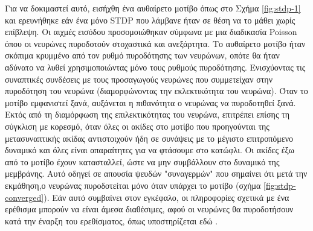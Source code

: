 \documentclass[12pt]{report}
\begin{document}
Για να δοκιμαστεί αυτό, εισήχθη ένα αυθαίρετο μοτίβο όπως στο Σχήμα \ref{fig:stdp-1} και ερευνήθηκε εάν ένα μόνο \textlatin{STDP} που λάμβανε ήταν σε θέση να το μάθει χωρίς επίβλεψη. Οι αιχμές εισόδου προσομοιώθηκαν σύμφωνα με μια διαδικασία \textlatin{Poisson} όπου οι νευρώνες πυροδοτούν στοχαστικά και ανεξάρτητα. Το αυθαίρετο μοτίβο ήταν σκόπιμα κρυμμένο από τον ρυθμό πυροδότησης των νευρώνων, οπότε θα ήταν αδύνατο να λυθεί χρησιμοποιώντας μόνο τους ρυθμούς πυροδότησης. Ενισχύοντας τις συναπτικές συνδέσεις με τους προσαγωγούς νευρώνες που συμμετείχαν στην πυροδότηση του νευρώνα (διαμορφώνοντας την εκλεκτικότητα του νευρώνα). Όταν το μοτίβο εμφανιστεί ξανά, αυξάνεται η πιθανότητα ο νευρώνας να πυροδοτηθεί ξανά. Εκτός από τη διαμόρφωση της επιλεκτικότητας του νευρώνα, επιτρέπει επίσης τη σύγκλιση με κορεσμό, όταν όλες οι ακίδες στο μοτίβο που προηγούνται της μετασυναπτικής ακίδας αντιστοιχούν ήδη σε συνάψεις με το μέγιστο επιτροπόμενο δυναμικό και όλες είναι απαραίτητες για να φτάσουμε στο κατώφλι. Οι ακίδες έξω από το μοτίβο έχουν κατασταλλεί, ώστε να μην συμβάλλουν στο δυναμικό της μεμβράνης. Αυτό οδηγεί σε απουσία ψευδών "συναγερμών" που σημαίνει ότι μετά την εκμάθηση,ο νευρώνας πυροδοτείται  μόνο όταν υπάρχει το μοτίβο (σχήμα \ref{fig:stdp-converged}). Εάν αυτό συμβαίνει στον εγκέφαλο, οι πληροφορίες σχετικά με ένα ερέθισμα μπορούν να είναι άμεσα διαθέσιμες, αφού οι νευρώνες θα πυροδοτήσουν κατά την έναρξη του ερεθίσματος, όπως υποστηρίζεται εδώ \cite{thorpe2001}.
\end{document}
